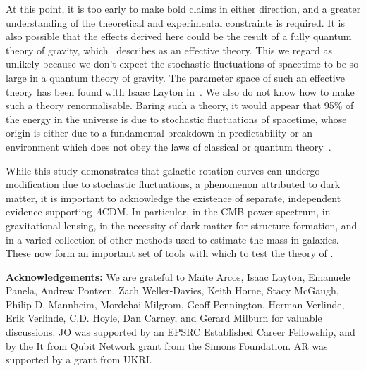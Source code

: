 \documentclass[aps,pra,amsmath,amssymb,amsthm,floatfix,nofootinbib,notitlepage,superscriptaddress,10pt]{revtex4-2}
\begin{document}
At this point, it is too early to make bold claims in either direction, and a greater understanding of the theoretical and experimental constraints is required. It is also possible that the effects derived here could be the result of a fully quantum theory of gravity, which~\cite{oppenheim2018post,oppenheim2023covariant} describes as an effective theory. This we regard as unlikely because we don't expect the stochastic fluctuations of spacetime to be so large in a quantum theory of gravity. The parameter space of such an effective theory has been found with Isaac Layton in~\cite{layton2023classical}. We also do not know how to make such a theory renormalisable. Baring such a theory, it would appear that 95\% of the energy in the universe is due to stochastic fluctuations of spacetime, whose origin is either due to a fundamental breakdown in predictability or an environment which does not obey the laws of classical or quantum theory~\cite{oppenheim2023soup}.

While this study demonstrates that galactic rotation curves can undergo modification due to stochastic fluctuations, a phenomenon attributed to dark matter, it is important to acknowledge the existence of separate, independent evidence supporting $\Lambda$CDM. In particular, in the CMB power spectrum, in gravitational lensing, in the necessity of dark matter for structure formation, and in a varied collection of other methods used to estimate the mass in galaxies. These now form an important set of tools with which to test the theory of \cite{oppenheim2018post,oppenheim2023covariant}.


{\bf \noindent Acknowledgements:} We are grateful to  Maite Arcos, Isaac Layton, Emanuele Panela, Andrew Pontzen, Zach Weller-Davies, Keith Horne, Stacy McGaugh, Philip D. Mannheim, Mordehai Milgrom, Geoff Pennington, Herman Verlinde, Erik Verlinde, C.D. Hoyle, Dan Carney, and Gerard Milburn for valuable discussions. JO was supported by an EPSRC Established Career Fellowship, and by the It from Qubit Network grant from the Simons Foundation. AR was supported by a grant from UKRI.






\newpage
\appendix
\end{document}
